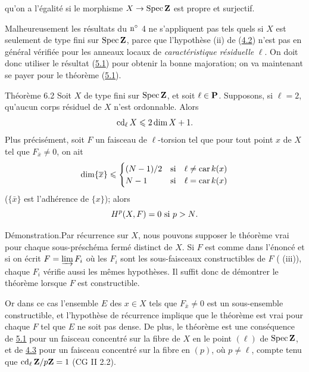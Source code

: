 \documentclass[10pt]{../fichiers-configuration-latex/smfart}
\begin{document}
 qu'on a
l'égalité si le morphisme $X\rightarrow \operatorname{Spec} \mathbf{Z}$ est propre
et surjectif.

Malheureusement les résultats du ${\rm n^{\circ}}$ 4 ne s'appliquent
pas tels quels si $X$ est seulement de type fini sur $\operatorname{Spec}
\mathbf{Z}$, parce que l'hypothèse (ii) de (\hyperref[X.cor4.2]{4.2}) n'est pas en général
vérifiée pour les anneaux locaux de \emph{caractéristique résiduelle}
$\ell$. On doit donc utiliser le résultat (\hyperref[X.thm5.1]{5.1}) pour obtenir la bonne
majoration; on va maintenant se payer pour le théorème (\hyperref[X.thm5.1]{5.1}).

\begin{enonce*}{Théorème 6.2}
Soit $X$ de type fini sur $\operatorname{Spec} \mathbf{Z}$, et soit $\ell\in
\mathbf{P}$. Supposons, si $\ell=2$, qu'aucun corps résiduel de $X$
n'est ordonnable. Alors
$$
\operatorname{cd}_{\ell}X\leqslant 2\dim X+1{}.
$$
Plus précisément, soit $F$ un faisceau de $\ell$-torsion tel que pour
tout point $x$ de $X$ tel que $F_{\bar{x}}\neq 0$, on ait
$$
\dim\{\overline{x}\}\leqslant
\begin{cases}
(N-1)/2 &\mbox{si\quad } \ell\neq \operatorname{car} k(x)\\
N-1     &\mbox{si\quad } \ell=\operatorname{car} k(x)
\end{cases}
$$
($\{\bar{x}\}$ est l'adhérence de $\{x\}$); alors
$$
H^p(X,F)=0\mbox{ si } p>N{}.
$$
\end{enonce*}

Démonstration.\pageoriginale Par récurrence sur $X$, nous pouvons supposer le
théorème vrai pour chaque sous-préschéma fermé distinct de $X$. Si $F$
est comme dans l'énoncé et si on écrit $F=\varinjlim F_i$ où les $F_i$
sont les sous-faisceaux constructibles de $F$ ( (iii)), chaque
$F_i$ vérifie aussi les mêmes hypothèses. Il suffit donc de démontrer
le théorème lorsque $F$ est constructible.

Or dans ce cas l'ensemble $E$ des $x\in X$ tels que $F_{\bar{x}}\neq
0$ est un sous-ensemble constructible, et l'hypothèse de récurrence
implique que le théorème est vrai pour chaque $F$ tel que $E$ ne soit
pas dense. De plus, le théorème est une conséquence de \hyperref[X.thm5.1]{5.1} pour un
faisceau concentré sur la fibre de $X$ en le point $(\ell)$ de $\operatorname{Spec}
\mathbf{Z}$, et de \hyperref[X.cor4.3]{4.3} pour un faisceau concentré sur la fibre en
$(p)$, où $p\neq \ell$, compte tenu que $\operatorname{cd}_{\ell}\mathbf{Z}/p
\mathbf{Z}=1$ (CG II 2.2).
\end{document}
